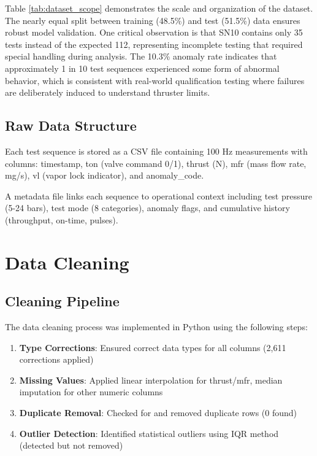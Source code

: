 \documentclass[12pt,a4paper]{article}
\begin{document}
Table \ref{tab:dataset_scope} demonstrates the scale and organization of the dataset. The nearly equal split between training (48.5\%) and test (51.5\%) data ensures robust model validation. One critical observation is that SN10 contains only 35 tests instead of the expected 112, representing incomplete testing that required special handling during analysis. The 10.3\% anomaly rate indicates that approximately 1 in 10 test sequences experienced some form of abnormal behavior, which is consistent with real-world qualification testing where failures are deliberately induced to understand thruster limits.

\subsection{Raw Data Structure}

Each test sequence is stored as a CSV file containing 100 Hz measurements with columns: timestamp, ton (valve command 0/1), thrust (N), mfr (mass flow rate, mg/s), vl (vapor lock indicator), and anomaly\_code.

A metadata file links each sequence to operational context including test pressure (5-24 bars), test mode (8 categories), anomaly flags, and cumulative history (throughput, on-time, pulses).

\section{Data Cleaning}

\subsection{Cleaning Pipeline}

The data cleaning process was implemented in Python using the following steps:

\begin{enumerate}
    \item \textbf{Type Corrections}: Ensured correct data types for all columns (2,611 corrections applied)
    \item \textbf{Missing Values}: Applied linear interpolation for thrust/mfr, median imputation for other numeric columns
    \item \textbf{Duplicate Removal}: Checked for and removed duplicate rows (0 found)
    \item \textbf{Outlier Detection}: Identified statistical outliers using IQR method (detected but not removed)
\end{enumerate}
\end{document}
